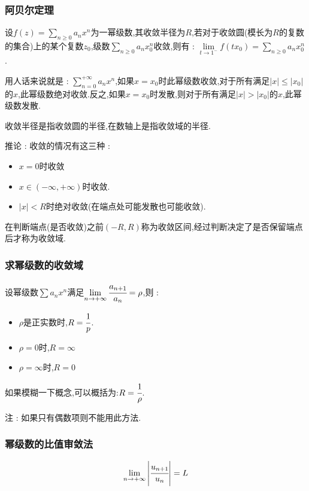 \documentclass[UTF8,12pt]{ctexbook}
\newcommand{\limNormal}[1]{\lim\limits_{#1}}
\newcommand{\upDownSum}[2]{\sum\limits_{#2}^{#1}}
\newcommand{\defFunction}[1]{f(#1)}
\newcommand{\absoluteValue}[1]{\left\lvert #1 \right\vert}
\begin{document}
{{{{\subsubsection{阿贝尔定理}{
  设$\defFunction{z} = \upDownSum{\ }{n \geq 0}a_nx^n$为一幂级数,其收敛半径为$R$,若对于收敛圆(模长为$R$的复数的集合)上的某个复数$z_0$,级数$\upDownSum{\ }{n \geq 0}a_nx^n_0$收敛,则有 : $\limNormal{t \to 1^-}\defFunction{tx_0} = \upDownSum{\ }{n \geq 0}a_nx^n_0$.

  用人话来说就是 : $\upDownSum{+\infty}{n = 0}a_nx^n$,如果$x = x_0$时此幂级数收敛,对于所有满足$\absoluteValue{x} \leq \absoluteValue{x_0}$的$x$,此幂级数绝对收敛.反之,如果$x = x_0$时发散,则对于所有满足$\absoluteValue{x} > \absoluteValue{x_0}$的$x$,此幂级数发散.

  收敛半径是指收敛圆的半径,在数轴上是指收敛域的半径.

  推论 : 收敛的情况有这三种 :
  \begin{itemize}
    \item $x = 0$时收敛
    \item $x \in (-\infty,+\infty)$时收敛.
    \item $\absoluteValue{x} < R$时绝对收敛(在端点处可能发散也可能收敛).
  \end{itemize}
  在判断端点(是否收敛)之前$(-R,R)$称为收敛区间,经过判断决定了是否保留端点后才称为收敛域.
}

\subsubsection{求幂级数的收敛域}{
  设幂级数$\sum a_nx^n$满足$\limNormal{n \to +\infty}\cfrac{a_{n + 1}}{a_n} = \rho$,则 :
  \begin{itemize}
    \item $\rho$是正实数时,$R = \cfrac{1}{p}$.
    \item $\rho = 0$时,$R = \infty$
    \item $\rho = \infty$时,$R = 0$
  \end{itemize}

  如果模糊一下概念,可以概括为:$R = \cfrac{1}{\rho}$.

  注 : 如果只有偶数项则不能用此方法.
}%

\subsubsection{幂级数的比值审敛法}{
$$
  \limNormal{n \to +\infty}\absoluteValue{\cfrac{u_{n + 1}}{u_n}} = L
$$

}}}}}
\end{document}
